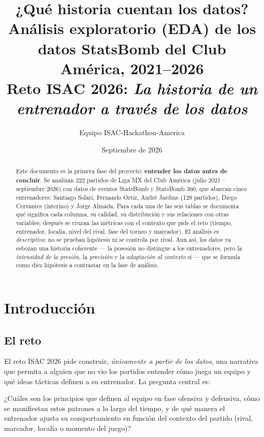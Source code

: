 \documentclass[11pt,a4paper]{article}
\title{\textbf{¿Qué historia cuentan los datos?}\\[4pt]
\large Análisis exploratorio (EDA) de los datos StatsBomb del Club América, 2021--2026\\[2pt]
\normalsize Reto ISAC 2026: \emph{La historia de un entrenador a través de los datos}}
\author{Equipo ISAC-Hackathon-America}
\date{Septiembre de 2026}
\begin{document}
\maketitle
\thispagestyle{empty}

\begin{abstract}
\noindent Este documento es la primera fase del proyecto: \textbf{entender los datos antes de concluir}. Se analizan 222 partidos de Liga MX del Club América (julio 2021 -- septiembre 2026) con datos de eventos StatsBomb y StatsBomb 360, que abarcan cinco entrenadores: Santiago Solari, Fernando Ortiz, André Jardine (129 partidos), Diego Cervantes (interino) y Jorge Almada. Para cada una de las seis tablas se documenta qué significa cada columna, su calidad, su distribución y sus relaciones con otras variables; después se cruzan las métricas con el contexto que pide el reto (tiempo, entrenador, localía, nivel del rival, fase del torneo y marcador). El análisis es \emph{descriptivo}: no se prueban hipótesis ni se controla por rival. Aun así, los datos ya esbozan una historia coherente --- la posesión no distingue a los entrenadores, pero la \emph{intensidad de la presión}, la \emph{precisión} y la \emph{adaptación al contexto} sí --- que se formula como diez hipótesis a contrastar en la fase de análisis.
\end{abstract}

\tableofcontents
\newpage

\section{Introducción}
\subsection{El reto}
El reto ISAC 2026 pide construir, \emph{únicamente a partir de los datos}, una narrativa que permita a alguien que no vio los partidos entender cómo juega un equipo y qué ideas tácticas definen a su entrenador. La pregunta central es:

\begin{historia}
¿Cuáles son los principios que definen al equipo en fase ofensiva y defensiva, cómo se manifiestan estos patrones a lo largo del tiempo, y de qué manera el entrenador ajusta su comportamiento en función del contexto del partido (rival, marcador, localía o momento del juego)?
\end{historia}
\end{document}
